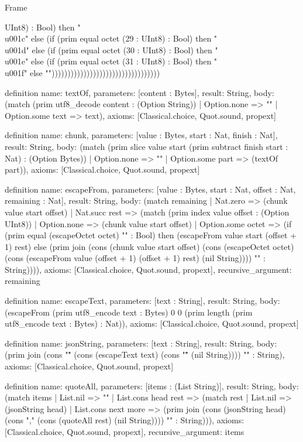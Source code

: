 \begin{lexlean}{Frame}
\begin{semanticmodule}
{UInt8) : Bool) then "\\u001c" else (if (prim equal octet (29 : UInt8) : Bool) then "\\u001d" else (if (prim equal octet (30 : UInt8) : Bool) then "\\u001e" else (if (prim equal octet (31 : UInt8) : Bool) then "\\u001f" else ""))))))))))))))))))))))))))))))))))
}

definition{
  name: textOf,
  parameters: [content : Bytes],
  result: String,
  body: (match (prim utf8_decode content : (Option String))
    | Option.none => ""
    | Option.some text => text),
  axioms: [Classical.choice, Quot.sound, propext]
}

definition{
  name: chunk,
  parameters: [value : Bytes, start : Nat, finish : Nat],
  result: String,
  body: (match (prim slice value start (prim subtract finish start : Nat) : (Option Bytes))
    | Option.none => ""
    | Option.some part => (textOf part)),
  axioms: [Classical.choice, Quot.sound, propext]
}

definition{
  name: escapeFrom,
  parameters: [value : Bytes, start : Nat, offset : Nat, remaining : Nat],
  result: String,
  body: (match remaining
    | Nat.zero => (chunk value start offset)
    | Nat.succ rest => (match (prim index value offset : (Option UInt8))
      | Option.none => (chunk value start offset)
      | Option.some octet => (if (prim equal (escapeOctet octet) "" : Bool) then (escapeFrom value start (offset + 1) rest) else (prim join (cons (chunk value start offset) (cons (escapeOctet octet) (cons (escapeFrom value (offset + 1) (offset + 1) rest) (nil String)))) "" : String)))),
  axioms: [Classical.choice, Quot.sound, propext],
  recursive_argument: remaining
}

definition{
  name: escapeText,
  parameters: [text : String],
  result: String,
  body: (escapeFrom (prim utf8_encode text : Bytes) 0 0 (prim length (prim utf8_encode text : Bytes) : Nat)),
  axioms: [Classical.choice, Quot.sound, propext]
}

definition{
  name: jsonString,
  parameters: [text : String],
  result: String,
  body: (prim join (cons "\"" (cons (escapeText text) (cons "\"" (nil String)))) "" : String),
  axioms: [Classical.choice, Quot.sound, propext]
}

definition{
  name: quoteAll,
  parameters: [items : (List String)],
  result: String,
  body: (match items
    | List.nil => ""
    | List.cons head rest => (match rest
      | List.nil => (jsonString head)
      | List.cons next more => (prim join (cons (jsonString head) (cons "," (cons (quoteAll rest) (nil String)))) "" : String))),
  axioms: [Classical.choice, Quot.sound, propext],
  recursive_argument: items
}


\end{semanticmodule}
\end{lexlean}
